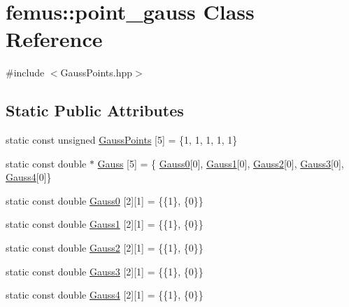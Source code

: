 \hypertarget{classfemus_1_1point__gauss}{}\section{femus\+:\+:point\+\_\+gauss Class Reference}
\label{classfemus_1_1point__gauss}


{\ttfamily \#include $<$Gauss\+Points.\+hpp$>$}

\subsection*{Static Public Attributes}
\begin{DoxyCompactItemize}
\item 
static const unsigned \mbox{\hyperlink{classfemus_1_1point__gauss_a80d513d3429338666fbdaddd36182e7a}{Gauss\+Points}} \mbox{[}5\mbox{]} = \{1, 1, 1, 1, 1\}
\item 
static const double $\ast$ \mbox{\hyperlink{classfemus_1_1point__gauss_a4b4a8c7238c2afceb2bd675078faf158}{Gauss}} \mbox{[}5\mbox{]} = \{ \mbox{\hyperlink{classfemus_1_1point__gauss_a7d58ad8603165947d21825ff1b749022}{Gauss0}}\mbox{[}0\mbox{]}, \mbox{\hyperlink{classfemus_1_1point__gauss_a670df080f9698bfc001f7a4d73945d05}{Gauss1}}\mbox{[}0\mbox{]}, \mbox{\hyperlink{classfemus_1_1point__gauss_a36d21b08eb50ca64956edb66a15edfd9}{Gauss2}}\mbox{[}0\mbox{]}, \mbox{\hyperlink{classfemus_1_1point__gauss_aaf1e339b9fa2ed9e3c798923ed37e58b}{Gauss3}}\mbox{[}0\mbox{]}, \mbox{\hyperlink{classfemus_1_1point__gauss_a6ad1647700b72dfa4f243736cead6d2a}{Gauss4}}\mbox{[}0\mbox{]}\}
\item 
static const double \mbox{\hyperlink{classfemus_1_1point__gauss_a7d58ad8603165947d21825ff1b749022}{Gauss0}} \mbox{[}2\mbox{]}\mbox{[}1\mbox{]} = \{\{1\}, \{0\}\}
\item 
static const double \mbox{\hyperlink{classfemus_1_1point__gauss_a670df080f9698bfc001f7a4d73945d05}{Gauss1}} \mbox{[}2\mbox{]}\mbox{[}1\mbox{]} = \{\{1\}, \{0\}\}
\item 
static const double \mbox{\hyperlink{classfemus_1_1point__gauss_a36d21b08eb50ca64956edb66a15edfd9}{Gauss2}} \mbox{[}2\mbox{]}\mbox{[}1\mbox{]} = \{\{1\}, \{0\}\}
\item 
static const double \mbox{\hyperlink{classfemus_1_1point__gauss_aaf1e339b9fa2ed9e3c798923ed37e58b}{Gauss3}} \mbox{[}2\mbox{]}\mbox{[}1\mbox{]} = \{\{1\}, \{0\}\}
\item 
static const double \mbox{\hyperlink{classfemus_1_1point__gauss_a6ad1647700b72dfa4f243736cead6d2a}{Gauss4}} \mbox{[}2\mbox{]}\mbox{[}1\mbox{]} = \{\{1\}, \{0\}\}
\end{DoxyCompactItemize}



